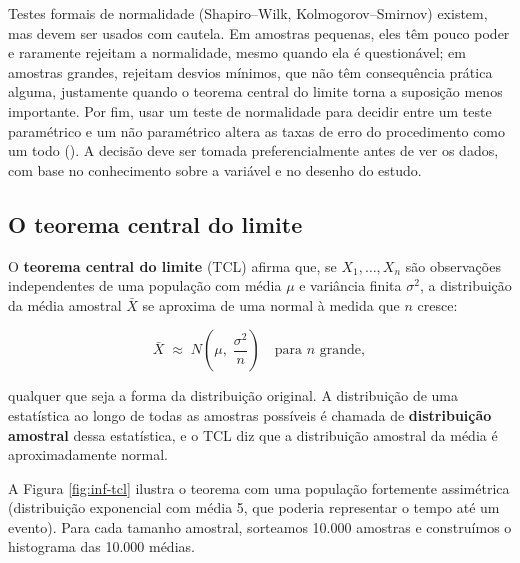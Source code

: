 \documentclass[
]{book}
\begin{document}
Testes formais de normalidade (Shapiro--Wilk, Kolmogorov--Smirnov) existem, mas devem ser usados com cautela. Em amostras pequenas, eles têm pouco poder e raramente rejeitam a normalidade, mesmo quando ela é questionável; em amostras grandes, rejeitam desvios mínimos, que não têm consequência prática alguma, justamente quando o teorema central do limite torna a suposição menos importante. Por fim, usar um teste de normalidade para decidir entre um teste paramétrico e um não paramétrico altera as taxas de erro do procedimento como um todo (). A decisão deve ser tomada preferencialmente antes de ver os dados, com base no conhecimento sobre a variável e no desenho do estudo.

\subsection{O teorema central do limite}\label{o-teorema-central-do-limite}

O \textbf{teorema central do limite} (TCL) afirma que, se \(X_1, \ldots, X_n\) são observações independentes de uma população com média \(\mu\) e variância finita \(\sigma^2\), a distribuição da média amostral \(\bar{X}\) se aproxima de uma normal à medida que \(n\) cresce:

\[
\bar{X} \;\approx\; N\!\left(\mu,\; \frac{\sigma^2}{n}\right) \quad \text{para } n \text{ grande},
\]

qualquer que seja a forma da distribuição original. A distribuição de uma estatística ao longo de todas as amostras possíveis é chamada de \textbf{distribuição amostral} dessa estatística, e o TCL diz que a distribuição amostral da média é aproximadamente normal.

A Figura \ref{fig:inf-tcl} ilustra o teorema com uma população fortemente assimétrica (distribuição exponencial com média 5, que poderia representar o tempo até um evento). Para cada tamanho amostral, sorteamos 10.000 amostras e construímos o histograma das 10.000 médias.
\end{document}
